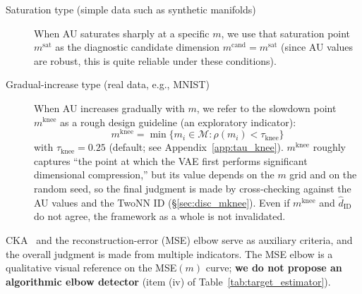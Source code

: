 \documentclass[make,article,submit,pdftex,moreauthors]{Definitions/mdpi}
\newcommand{\dzopt}{m^{\mathrm{cand}}}
\newcommand{\dzsat}{m^{\mathrm{sat}}}
\newcommand{\mknee}{m^{\mathrm{knee}}}
\begin{document}
\begin{description}
  \item[Saturation type (simple data such as synthetic manifolds)]
        When AU saturates sharply at a specific $m$, we use that saturation point
        $\dzsat$ as the diagnostic candidate dimension $\dzopt = \dzsat$
        (since AU values are robust, this is quite reliable under these
        conditions).
  \item[Gradual-increase type (real data, e.g., MNIST)]
        When AU increases gradually with $m$, we refer to the slowdown point
        $\mknee$ as a rough design guideline (an exploratory indicator):
        \begin{equation}
          \mknee = \min\{m_i \in \mathcal{M} : \rho(m_i) < \tau_{\mathrm{knee}}\}
          \label{eq:mknee}
        \end{equation}
        with $\tau_{\mathrm{knee}} = 0.25$ (default; see Appendix~\ref{app:tau_knee}).
        $\mknee$ roughly captures ``the point at which the VAE first performs
        significant dimensional compression,'' but its value depends on the $m$
        grid and on the random seed, so the final judgment is made by
        cross-checking against the AU values and the TwoNN ID
        (§\ref{sec:disc_mknee}).
        Even if $\mknee$ and $\hat{d}_\mathrm{ID}$ do not agree, the framework as a
        whole is not invalidated.
\end{description}

CKA~\cite{kornblith2019cka} and the reconstruction-error (MSE) elbow serve as
auxiliary criteria, and the overall judgment is made from multiple indicators.
The MSE elbow is a qualitative visual reference on the MSE$(m)$ curve;
\textbf{we do not propose an algorithmic elbow detector}
(item (iv) of Table~\ref{tab:target_estimator}).
\end{document}
